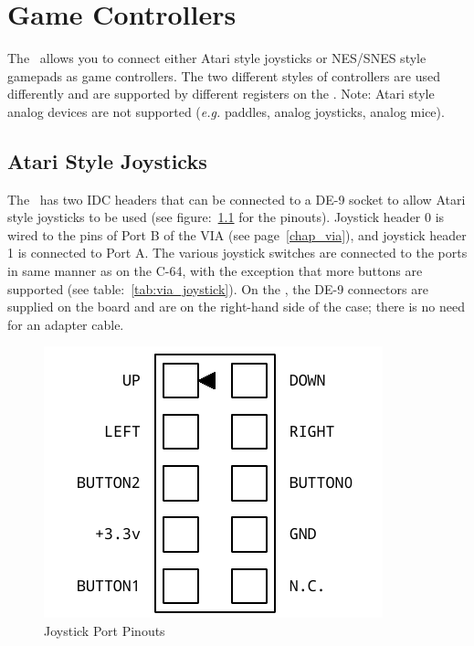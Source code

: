 \chapter{Game Controllers}

The \jr\ allows you to connect either Atari style joysticks or NES/SNES style gamepads as game controllers. The two different styles of controllers are used differently and are supported by different registers on the \jr. Note: Atari style analog devices are not supported ({\it e.g.} paddles, analog joysticks, analog mice).

\section*{Atari Style Joysticks}

The \fjr\ has two IDC headers that can be connected to a DE-9 socket to allow Atari style joysticks to be used (see figure:~\ref{fig:joystick_ports} for the pinouts). Joystick header 0 is wired to the pins of Port B of the VIA (see page~\ref{chap_via}), and joystick header 1 is connected to Port A. The various joystick switches are connected to the ports in same manner as on the C-64, with the exception that more buttons are supported (see table:~\ref{tab:via_joystick}). On the \fk, the DE-9 connectors are supplied on the board and are on the right-hand side of the case; there is no need for an adapter cable.

\begin{figure}[ht]
    \begin{center}
        \includegraphics[scale=0.65]{images/f256_port_joystick.pdf}
    \end{center}
    \caption{Joystick Port Pinouts}
    \label{fig:joystick_ports}
\end{figure}

